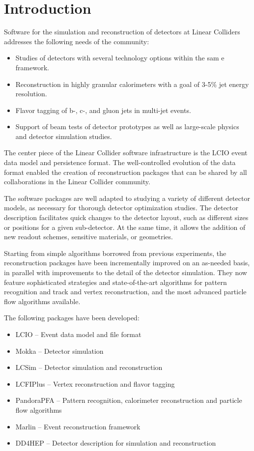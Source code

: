\section{Introduction}
Software for the simulation and reconstruction of detectors at Linear Colliders addresses the following needs of the community:
\begin{itemize}
	\item Studies of detectors with several technology options within the sam e framework.
	\item Reconstruction in highly granular calorimeters with a goal of 3-5\% jet energy resolution.
	\item Flavor tagging of b-, c-, and gluon jets in multi-jet events.
	\item Support of beam tests of detector prototypes as well as large-scale physics and detector simulation studies.
\end{itemize}

The center piece of the Linear Collider software infrastructure is the LCIO event data model and persistence format. The well-controlled evolution of the data format enabled the creation of reconstruction packages that can be shared by all collaborations in the Linear Collider community.

The software packages are well adapted to studying a variety of different detector models, as necessary for thorough detector optimization studies. The detector description facilitates quick changes to the detector layout, such as different sizes or positions for a given sub-detector. At the same time, it allows the addition of new readout schemes, sensitive materials, or geometries.

Starting from simple algorithms borrowed from previous experiments, the reconstruction packages have been incrementally improved on an as-needed basis, in parallel with improvements to the detail of the detector simulation. They now feature sophisticated strategies and state-of-the-art algorithms for pattern recognition and track and vertex reconstruction, and the most advanced particle flow algorithms available.

The following packages have been developed:
\begin{itemize}
	\item LCIO -- Event data model and file format
	\item Mokka -- Detector simulation
	\item LCSim -- Detector simulation and reconstruction
	\item LCFIPlus -- Vertex reconstruction and flavor tagging
	\item PandoraPFA -- Pattern recognition, calorimeter reconstruction and particle flow algorithms
	\item Marlin -- Event reconstruction framework
	\item DD4HEP -- Detector description for simulation and reconstruction
\end{itemize}
